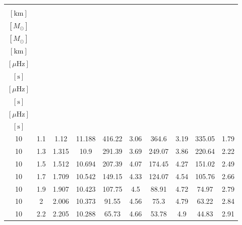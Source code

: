 \begin{tabular}{cccccccccc}
\toprule
\makecell{$R_{\rm cci}$ \\[1ex] $[\text{km}]$} & \makecell{$M_{\rm core}$ \\[1ex] $[M_{\odot}]$} & \makecell{$M_{\rm NS}$ \\[1ex] $[M_{\odot}]$} & \makecell{$R_{\rm NS}$ \\[1ex] $[\text{km}]$} & \makecell{$\Delta\nu_{\rm max, A}$ \\[1ex] $[\mu\text{Hz}]$} & \makecell{$t_{\rm max, A}$ \\[1ex] $[\text{s}]$} & \makecell{$\Delta\nu_{\rm max, B}$ \\[1ex] $[\mu\text{Hz}]$} & \makecell{$t_{\rm max, B}$ \\[1ex] $[\text{s}]$} & \makecell{$\Delta\nu_{\rm max, C}$ \\[1ex] $[\mu\text{Hz}]$} & \makecell{$t_{\rm max, C}$ \\[1ex] $[\text{s}]$} \\
\midrule
10 & 1.1 & 1.12 & 11.188 & 416.22 & 3.06 & 364.6 & 3.19 & 335.05 & 1.79 \\
10 & 1.3 & 1.315 & 10.9 & 291.39 & 3.69 & 249.07 & 3.86 & 220.64 & 2.22 \\
10 & 1.5 & 1.512 & 10.694 & 207.39 & 4.07 & 174.45 & 4.27 & 151.02 & 2.49 \\
10 & 1.7 & 1.709 & 10.542 & 149.15 & 4.33 & 124.07 & 4.54 & 105.76 & 2.66 \\
10 & 1.9 & 1.907 & 10.423 & 107.75 & 4.5 & 88.91 & 4.72 & 74.97 & 2.79 \\
10 & 2 & 2.006 & 10.373 & 91.55 & 4.56 & 75.3 & 4.79 & 63.22 & 2.84 \\
10 & 2.2 & 2.205 & 10.288 & 65.73 & 4.66 & 53.78 & 4.9 & 44.83 & 2.91 \\
\bottomrule
\end{tabular}
